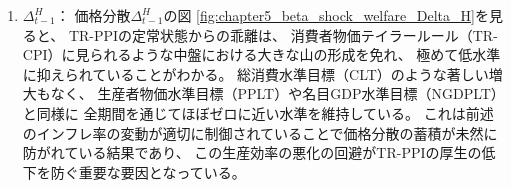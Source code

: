 \begin{enumerate}
        生産者物価インフレ率に反応するテイラールールとして機能しているため、
        TR-CPIと比較してインフレ率のブレが適切に制御されており、
        この定常状態からの乖離の小ささが次項で述べる価格分散の蓄積を抑え、厚生の悪化を防ぐ要因となっている。
    \item
    \label{itm:chapter5_beta_shock_policies_tr_ppi_Delta_t_minus_1_H}
        \(\Delta_{t-1}^H\)：
        価格分散\(\Delta_{t-1}^H\)の図
        \ref{fig:chapter5_beta_shock_welfare_Delta_H}を見ると、
        TR-PPIの定常状態からの乖離は、
        消費者物価テイラールール（TR-CPI）に見られるような中盤における大きな山の形成を免れ、
        極めて低水準に抑えられていることがわかる。
        総消費水準目標（CLT）のような著しい増大もなく、
        生産者物価水準目標（PPLT）や名目GDP水準目標（NGDPLT）と同様に
        全期間を通じてほぼゼロに近い水準を維持している。
        これは前述のインフレ率の変動が適切に制御されていることで価格分散の蓄積が未然に防がれている結果であり、
        この生産効率の悪化の回避がTR-PPIの厚生の低下を防ぐ重要な要因となっている。
\end{enumerate}